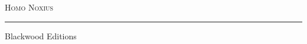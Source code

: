 \documentclass[11pt,twoside,openright]{book}
\begin{document}
\begin{titlepage}
\thispagestyle{empty}
\centering
\vspace*{1.25in}
{\Huge\scshape Homo Noxius\par}
\vspace{0.35in}
{\color{rulegold}\rule{0.55\textwidth}{0.4pt}\par}
\vfill
{\small Blackwood Editions \par}
\vspace*{0.65in}
\end{titlepage}


\end{document}
